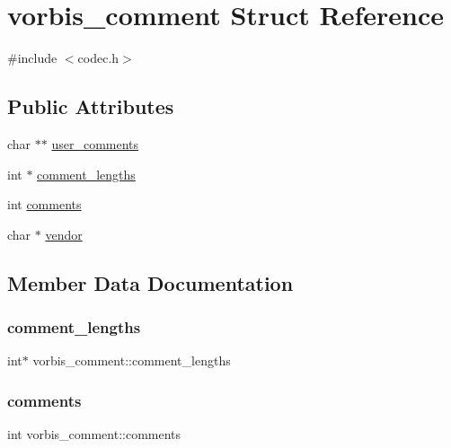 \hypertarget{structvorbis__comment}{}\section{vorbis\+\_\+comment Struct Reference}
\label{structvorbis__comment}


{\ttfamily \#include $<$codec.\+h$>$}

\subsection*{Public Attributes}
\begin{DoxyCompactItemize}
\item 
char $\ast$$\ast$ \mbox{\hyperlink{structvorbis__comment_ac45cb70542b0be5ce3e8d85db6df48ec}{user\+\_\+comments}}
\item 
int $\ast$ \mbox{\hyperlink{structvorbis__comment_a4698d400a859e9338a5828ead97cacdf}{comment\+\_\+lengths}}
\item 
int \mbox{\hyperlink{structvorbis__comment_aa338208fb0f485b3818832a7d07dbe92}{comments}}
\item 
char $\ast$ \mbox{\hyperlink{structvorbis__comment_a1f25158a2c045a6dd8a13b33b34612d3}{vendor}}
\end{DoxyCompactItemize}


\subsection{Member Data Documentation}
\mbox{\label{structvorbis__comment_a4698d400a859e9338a5828ead97cacdf}} 
\subsubsection{\texorpdfstring{comment\+\_\+lengths}{comment\_lengths}}
{\footnotesize\ttfamily int$\ast$ vorbis\+\_\+comment\+::comment\+\_\+lengths}

\mbox{\label{structvorbis__comment_aa338208fb0f485b3818832a7d07dbe92}} 
\subsubsection{\texorpdfstring{comments}{comments}}
{\footnotesize\ttfamily int vorbis\+\_\+comment\+::comments}

